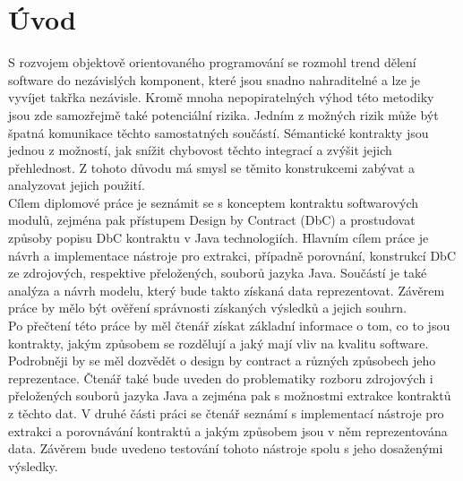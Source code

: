 \chapter{Úvod}

S rozvojem objektově orientovaného programování se rozmohl trend dělení software do nezávislých komponent, které jsou snadno nahraditelné a lze je vyvíjet takřka nezávisle. Kromě mnoha nepopiratelných výhod této metodiky jsou zde samozřejmě také potenciální rizika. Jedním z možných rizik může být špatná komunikace těchto samostatných součástí. Sémantické kontrakty jsou jednou z možností, jak snížit chybovost těchto integrací a zvýšit jejich přehlednost. Z tohoto důvodu má smysl se těmito konstrukcemi zabývat a analyzovat jejich použití.\\

Cílem diplomové práce je seznámit se s konceptem kontraktu softwarových modulů, zejména pak přístupem Design by Contract (DbC) a prostudovat způsoby popisu DbC kontraktu v Java technologiích. Hlavním cílem práce je návrh a implementace nástroje pro extrakci, případně porovnání, konstrukcí DbC ze zdrojových, respektive přeložených, souborů jazyka Java. Součástí je také analýza a návrh modelu, který bude takto získaná data reprezentovat. Závěrem práce by mělo být ověření správnosti získaných výsledků a jejich souhrn.\\ 

Po přečtení této práce by měl čtenář získat základní informace o tom, co to jsou kontrakty, jakým způsobem se rozdělují a jaký mají vliv na kvalitu software. Podrobněji by se měl dozvědět o design by contract a různých způsobech jeho reprezentace. Čtenář také bude uveden do problematiky rozboru zdrojových i přeložených souborů jazyka Java a zejména pak s možnostmi extrakce kontraktů z těchto dat. V druhé části práci se čtenář seznámí s implementací nástroje pro extrakci a porovnávání kontraktů a jakým způsobem jsou v něm reprezentována data. Závěrem bude uvedeno testování tohoto nástroje spolu s jeho dosaženými výsledky.